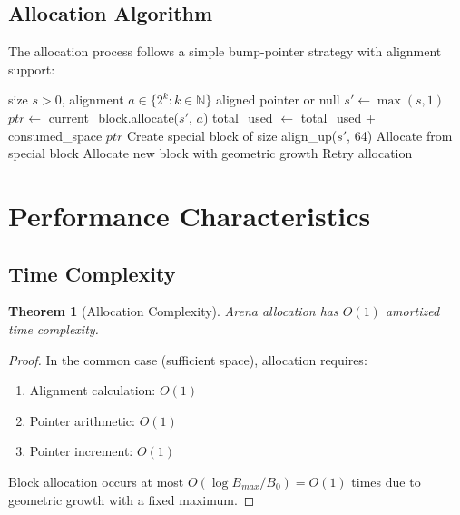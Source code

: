 \documentclass[11pt,a4paper]{article}
\newtheorem{theorem}{Theorem}
\begin{document}
\subsection{Allocation Algorithm}

The allocation process follows a simple bump-pointer strategy with alignment support:

\begin{algorithm}
\caption{Arena Allocation}
\label{alg:allocate}
\begin{algorithmic}[1]
\REQUIRE size $s > 0$, alignment $a \in \{2^k : k \in \mathbb{N}\}$
\ENSURE aligned pointer or null
\STATE $s' \leftarrow \max(s, 1)$ 
    \STATE $ptr \leftarrow$ current\_block.allocate($s'$, $a$)
    \STATE total\_used $\leftarrow$ total\_used + consumed\_space
    \RETURN $ptr$
    \STATE Create special block of size align\_up($s'$, 64)
    \STATE Allocate from special block
\ELSE
    \STATE Allocate new block with geometric growth
    \STATE Retry allocation
\ENDIF
\end{algorithmic}
\end{algorithm}

\section{Performance Characteristics}

\subsection{Time Complexity}

\begin{theorem}[Allocation Complexity]
Arena allocation has $O(1)$ amortized time complexity.
\end{theorem}

\begin{proof}
In the common case (sufficient space), allocation requires:
\begin{enumerate}
    \item Alignment calculation: $O(1)$
    \item Pointer arithmetic: $O(1)$
    \item Pointer increment: $O(1)$
\end{enumerate}
Block allocation occurs at most $O(\log B_{max}/B_0) = O(1)$ times due to geometric growth with a fixed maximum.
\end{proof}
\end{document}
